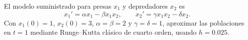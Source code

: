 El modelo suministrado para presas \(x_1\) y depredadores \(x_2\) es
\[x_1'=\alpha x_1-\beta x_1x_2,\qquad x_2'=\gamma x_1x_2-\delta x_2.\]
Con \(x_1(0)=1\), \(x_2(0)=3\), \(\alpha=\beta=2\) y \(\gamma=\delta=1\),
aproximar las poblaciones en \(t=1\) mediante Runge--Kutta clásico de cuarto orden,
usando \(h=0.025\).
